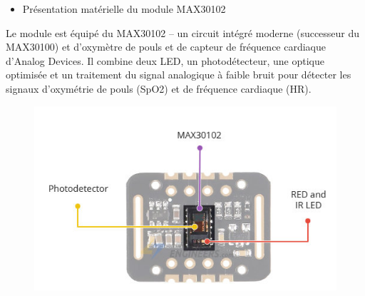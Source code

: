 \begin{flushleft}
		\begin{itemize}
			\item {\Large  Présentation matérielle du module MAX30102}
		\end{itemize}
		Le module est équipé du MAX30102 – un circuit intégré moderne (successeur du MAX30100) et d’oxymètre de pouls et de capteur de fréquence cardiaque d’Analog Devices. Il combine deux LED, un photodétecteur, une optique optimisée et un traitement du signal analogique à faible bruit pour détecter les signaux d’oxymétrie de pouls (SpO2) et de fréquence cardiaque (HR).
		\begin{figure}[h]
			\centering
			\includegraphics{chapitres/images/Capteur2.PNG}
			\label{fig:labelname}
		\end{figure}
		

\end{flushleft}
